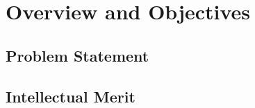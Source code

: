 \section{Overview and Objectives}

\subsection{Problem Statement}


\subsection{Intellectual Merit}
